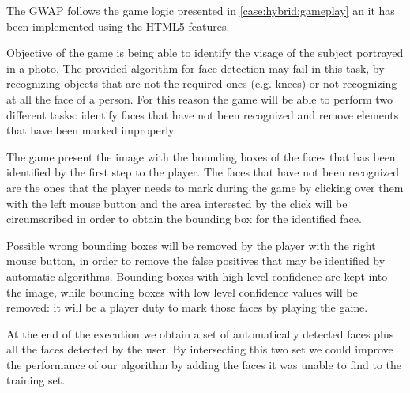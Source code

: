 The \ac{GWAP} follows the game logic presented in \ref{case:hybrid:gameplay} an
it has been implemented using the \ac{HTML}5 features.

Objective of the game is being able to identify the visage of the subject
portrayed in a photo. The provided algorithm for face detection may fail in this
task, by recognizing objects that are not the required ones (e.g. knees) or not
recognizing at all the face of a person. For this reason the game will be able
to perform two different tasks: identify faces that have not been recognized and
remove elements that have been marked improperly.

The game present the image with the bounding boxes of the faces that has been
identified by the first step to the player. The faces that have not been
recognized are the ones that the player needs to mark during the game by
clicking over them with the left mouse button and the area interested by the
click will be circumscribed in order to obtain the bounding box for the identified
face. 

Possible wrong bounding boxes will be removed by the player with the right mouse
button, in order to remove the false positives that may be identified by automatic
algorithms. Bounding boxes with high level confidence are kept into the image,
while bounding boxes with low level confidence values will be removed: it will
be a player duty to mark those faces by playing the game.

At the end of the execution we obtain a set of automatically detected faces plus
all the faces detected by the user. By intersecting this two set we could improve
the performance of our algorithm by adding the faces it was unable to find to
the training set.